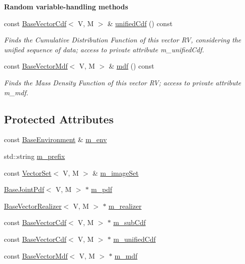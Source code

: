 \begin{Indent}{\bf Random variable-\/handling methods}
\begin{DoxyCompactItemize}
const \hyperlink{class_q_u_e_s_o_1_1_base_vector_cdf}{Base\-Vector\-Cdf}$<$ V, M $>$ \& \hyperlink{class_q_u_e_s_o_1_1_base_vector_r_v_a045a14e1ee948ac3162199a06606ce80}{unified\-Cdf} () const 
\begin{DoxyCompactList}\small\item\em Finds the Cumulative Distribution Function of this vector R\-V, considering the unified sequence of data; access to private attribute m\-\_\-unified\-Cdf. \end{DoxyCompactList}\item 
const \hyperlink{class_q_u_e_s_o_1_1_base_vector_mdf}{Base\-Vector\-Mdf}$<$ V, M $>$ \& \hyperlink{class_q_u_e_s_o_1_1_base_vector_r_v_a81f6ade1c28022b813d1276f2c217404}{mdf} () const 
\begin{DoxyCompactList}\small\item\em Finds the Mass Density Function of this vector R\-V; access to private attribute m\-\_\-mdf. \end{DoxyCompactList}\end{DoxyCompactItemize}
\end{Indent}
\subsection*{Protected Attributes}
\begin{DoxyCompactItemize}
\item 
const \hyperlink{class_q_u_e_s_o_1_1_base_environment}{Base\-Environment} \& \hyperlink{class_q_u_e_s_o_1_1_base_vector_r_v_a556761c50e2d171977ef5f19a63c8c73}{m\-\_\-env}
\item 
std\-::string \hyperlink{class_q_u_e_s_o_1_1_base_vector_r_v_a030ce3bc9873a9eaf6d8bf452c096ab3}{m\-\_\-prefix}
\item 
const \hyperlink{class_q_u_e_s_o_1_1_vector_set}{Vector\-Set}$<$ V, M $>$ \& \hyperlink{class_q_u_e_s_o_1_1_base_vector_r_v_ad31872bb4da22d47528cb9d691b3b7ff}{m\-\_\-image\-Set}
\item 
\hyperlink{class_q_u_e_s_o_1_1_base_joint_pdf}{Base\-Joint\-Pdf}$<$ V, M $>$ $\ast$ \hyperlink{class_q_u_e_s_o_1_1_base_vector_r_v_a0ca926bca6fbcc688be6fc7496449e8e}{m\-\_\-pdf}
\item 
\hyperlink{class_q_u_e_s_o_1_1_base_vector_realizer}{Base\-Vector\-Realizer}$<$ V, M $>$ $\ast$ \hyperlink{class_q_u_e_s_o_1_1_base_vector_r_v_ad99bc05293c0fd0a0accb3191fb7119e}{m\-\_\-realizer}
\item 
const \hyperlink{class_q_u_e_s_o_1_1_base_vector_cdf}{Base\-Vector\-Cdf}$<$ V, M $>$ $\ast$ \hyperlink{class_q_u_e_s_o_1_1_base_vector_r_v_a1a1117671c7fa2e572a9484463bee3a5}{m\-\_\-sub\-Cdf}
\item 
const \hyperlink{class_q_u_e_s_o_1_1_base_vector_cdf}{Base\-Vector\-Cdf}$<$ V, M $>$ $\ast$ \hyperlink{class_q_u_e_s_o_1_1_base_vector_r_v_a31a1d44bbb6a7c030ca31a9577904252}{m\-\_\-unified\-Cdf}
\item 
const \hyperlink{class_q_u_e_s_o_1_1_base_vector_mdf}{Base\-Vector\-Mdf}$<$ V, M $>$ $\ast$ \hyperlink{class_q_u_e_s_o_1_1_base_vector_r_v_a5a95d0107f66cf9b0ed3ad18a3d738df}{m\-\_\-mdf}
\end{DoxyCompactItemize}
